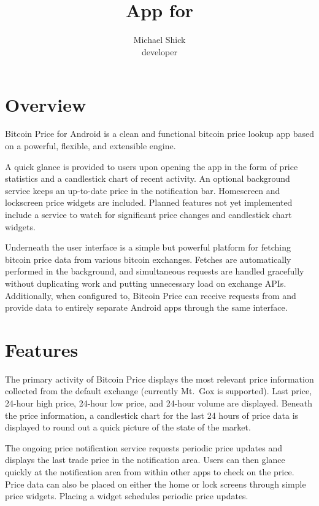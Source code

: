 \documentclass[twocolumn]{article}
\title{\org \\ \app App for \platform}
\author{Michael Shick \\ \app developer}
\newcommand{\app}{Bitcoin Price\xspace}
\newcommand{\platform}{Android\xspace}
\newcommand{\onlyexch}{Mt.~Gox\xspace}
\begin{document}
    \maketitle

    \section*{Overview}

    \app for \platform is a clean and functional bitcoin price lookup app based
    on a powerful, flexible, and extensible engine.

    A quick glance is provided to users upon opening the app in the form of
    price statistics and a candlestick chart of recent activity.  An optional
    background service keeps an up-to-date price in the notification bar.
    Homescreen and lockscreen price widgets are included.  Planned features not
    yet implemented include a service to watch for significant price changes
    and candlestick chart widgets.

    Underneath the user interface is a simple but powerful platform for
    fetching bitcoin price data from various bitcoin exchanges.  Fetches are
    automatically performed in the background, and simultaneous requests are
    handled gracefully without duplicating work and putting unnecessary load on
    exchange APIs.  Additionally, when configured to, \app can receive requests
    from and provide data to entirely separate \platform apps through the same
    interface.

    \section*{Features}

    The primary activity of \app displays the most relevant price information
    collected from the default exchange (currently \onlyexch is supported).
    Last price, 24-hour high price, 24-hour low price, and 24-hour volume are
    displayed.  Beneath the price information, a candlestick chart for the last
    24 hours of price data is displayed to round out a quick picture of the
    state of the market.

    The ongoing price notification service requests periodic price updates and
    displays the last trade price in the notification area.  Users can then
    glance quickly at the notification area from within other apps to check on
    the price.  Price data can also be placed on either the home or lock
    screens through simple price widgets.  Placing a widget schedules periodic
    price updates.
\end{document}
